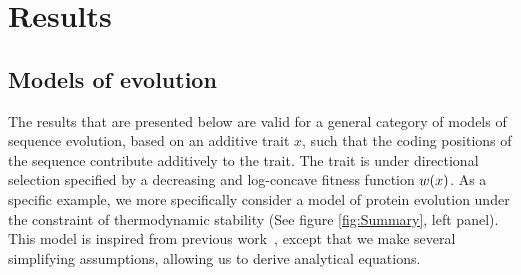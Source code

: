 \section{Results}

\subsection{Models of evolution}

The results that are presented below are valid for a general category of models of sequence evolution, based on an additive trait $x$, such that the coding positions of the sequence contribute additively to the trait.
The trait is under directional selection specified by a decreasing and log-concave fitness function $ w (x)$.
As a specific example, we more specifically consider a model of protein evolution under the constraint of thermodynamic stability (See figure \ref{fig:Summary}, left panel).
This model is inspired from previous work~\citep{Williams2006, Goldstein2011, Pollock2012}, except that we make several simplifying assumptions, allowing us to derive analytical equations.

